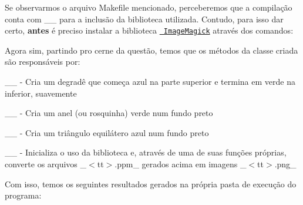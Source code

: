 Se observarmos o arquivo Makefile mencionado, perceberemos que a compilação conta com \+\_\+\_\+ para a inclusão da biblioteca utilizada. Contudo, para isso dar certo, {\bfseries{antes}} é preciso instalar a biblioteca \href{https://imagemagick.org/index.php}{\texttt{ Image\+Magick}} através dos comandos\+:


\begin{DoxyCode}{0}

\end{DoxyCode}


Agora sim, partindo pro cerne da questão, temos que os métodos da classe criada  são responsáveis por\+:


\begin{DoxyItemize}
\item \+\_\+\_\+ -\/ Cria um degradê que começa azul na parte superior e termina em verde na inferior, suavemente
\item \+\_\+\_\+ -\/ Cria um anel (ou rosquinha) verde num fundo preto
\item \+\_\+\_\+ -\/ Cria um triângulo equilátero azul num fundo preto
\item \+\_\+\_\+ -\/ Inicializa o uso da biblioteca e, através de uma de suas funções próprias, converte os arquivos \+\_\+$<$tt$>$.\+ppm\+\_\+ gerados acima em imagens \+\_\+$<$tt$>$.\+png\+\_\+
\end{DoxyItemize}

Com isso, temos os seguintes resultados gerados na própria pasta de execução do programa\+:

   